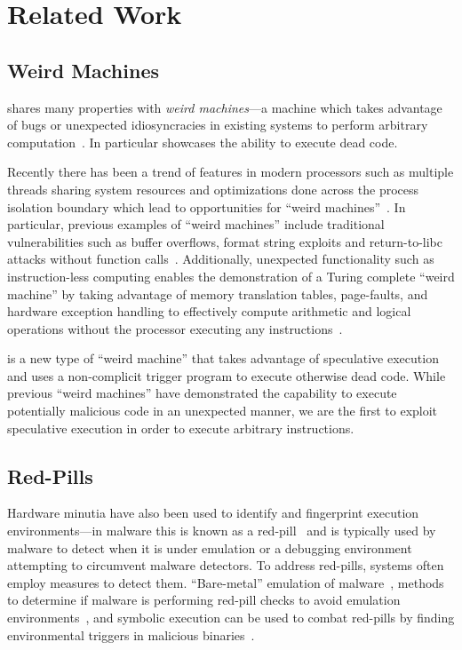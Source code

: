 \section{Related Work}
\label{sec:related-work}


\subsection{Weird Machines}

\speculake shares many properties with \textit{weird machines}---a machine which
takes advantage of bugs or unexpected idiosyncracies in existing systems to
perform arbitrary
computation~\cite{weird_machines,bratus2011exploit}. In
particular \speculake showcases the ability to execute dead code.

Recently there has been a trend of features in modern processors such as
multiple threads sharing system resources and optimizations done across the
process isolation boundary which lead to opportunities for ``weird
machines''~\cite{d2015exploiting}. In particular, previous examples of ``weird
machines'' include traditional vulnerabilities such as buffer overflows, format
string exploits and return-to-libc attacks without function
calls~\cite{buffer_overflow, format_string_exploit, shacham2007geometry}.
Additionally, unexpected functionality such as instruction-less computing
enables the demonstration of a Turing complete ``weird machine'' by taking
advantage of memory translation tables, page-faults, and hardware exception
handling to effectively compute arithmetic and logical operations without the
processor executing any instructions~\cite{bangert2013page}.

\speculake is a new type of ``weird machine'' that takes advantage of
speculative execution and uses a non-complicit trigger program to execute
otherwise dead code. While previous ``weird machines'' have demonstrated the
capability to execute potentially malicious code in an unexpected manner, we are
the first to exploit speculative execution in order to execute arbitrary
instructions.

\subsection{Red-Pills}
Hardware minutia have also been used to identify and fingerprint execution
environments---in malware this is known as a red-pill~\cite{red-pill} and is
typically used by malware to detect when it is under emulation or a debugging
environment~\cite{lindorfer2011detecting, balzarotti2010efficient,
paleari2009fistful} attempting to circumvent malware detectors. To address
red-pills, systems often employ measures to detect them. ``Bare-metal''
emulation of malware~\cite{kirat2011barebox}, methods to determine if malware is
performing red-pill checks to avoid emulation
environments~\cite{kirat2014barecloud}, and symbolic execution can be used to
combat red-pills by finding environmental triggers in malicious
binaries~\cite{schwartz2010all}. 

